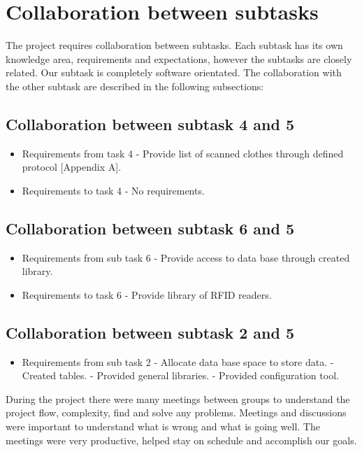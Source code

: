 %
\section{Collaboration between subtasks}

The project requires collaboration between subtasks. Each subtask has its own knowledge area, requirements and expectations, however the subtasks are closely related. Our subtask is completely software orientated. The collaboration with the other subtask are described in the following subsections:

\subsection{Collaboration between subtask 4 and 5}
\begin{itemize}
	\item Requirements from task 4
	\subitem - Provide list of scanned clothes through defined protocol [Appendix A].
	\item Requirements to task 4
	\subitem - No requirements.
\end{itemize}

\subsection{Collaboration between subtask 6 and 5}
\begin{itemize}
	\item Requirements from sub task 6
	\subitem - Provide access to data base through created library.
	\item Requirements to task 6
	\subitem - Provide library of RFID readers.
\end{itemize}

\subsection{Collaboration between subtask 2 and 5}
\begin{itemize}
	\item Requirements from sub task 2
	\subitem - Allocate data base space to store data.
	\subitem - Created tables.
	\subitem - Provided general libraries.
	\subitem - Provided configuration tool.
\end{itemize}

During the project there were many meetings between groups to understand the project flow, complexity, find and solve any problems. Meetings and discussions were important to understand what is wrong and what is going well. The meetings were very productive, helped stay on schedule and accomplish our goals.